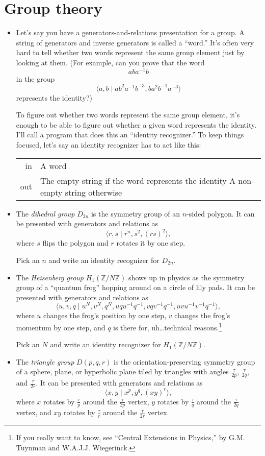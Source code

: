 \documentclass{article}
\newcommand*{\note}{\item[\Letter]}
\newcommand*{\writeit}{\item[\NibRight]}
\newcommand{\spec}[1]{{\sc #1}}
\begin{document}
\section*{Group theory}
\begin{itemize}
\note
Let's say you have a generators-and-relations presentation for a group. A string of generators and inverse generators is called a ``word.'' It's often very hard to tell whether two words represent the same group element just by looking at them. (For example, can you prove that the word
\[ aba^{-1}b \]
in the group
\[ \langle a, b \mid ab^2a^{-1}b^{-3}, ba^2b^{-1}a^{-3} \rangle \]
represents the identity?)

To figure out whether two words represent the same group element, it's enough to be able to figure out whether a given word represents the identity. I'll call a program that does this an ``identity recognizer.'' To keep things focused, let's say an identity recognizer has to act like this:

\begin{tabularx}{\textwidth}{rX}
\spec{in} & A word \\
\spec{out} & The empty string if the word represents the identity \newline A non-empty string otherwise
\end{tabularx}
\writeit
The {\em dihedral group} $D_{2n}$ is the symmetry group of an $n$-sided polygon. It can be presented with generators and relations as
\[ \langle r, s \mid r^n, s^2, (rs)^2 \rangle, \]
where $s$ flips the polygon and $r$ rotates it by one step.

Pick an $n$ and write an identity recognizer for $D_{2n}$.
\writeit
The {\em Heisenberg group} $H_1(\mathbb{Z}/N\mathbb{Z})$ shows up in physics as the symmetry group of a ``quantum frog'' hopping around on a circle of lily pads. It can be presented with generators and relations as
\[ \langle u, v, q \mid u^N, v^N, q^N, uqu^{-1}q^{-1}, vqv^{-1}q^{-1}, uvu^{-1}v^{-1}q^{-1} \rangle, \]
where $u$ changes the frog's position by one step, $v$ changes the frog's momentum by one step, and $q$ is there for, uh\ldots technical reasons.\footnote{If you really want to know, see ``Central Extensions in Physics,'' by G.M. Tuynman and W.A.J.J. Wiegerinck.}

Pick an $N$ and write an identity recognizer for $H_1(\mathbb{Z}/N\mathbb{Z})$.
\writeit
The {\em triangle group} $D(p, q, r)$ is the orientation-preserving symmetry group of a sphere, plane, or hyperbolic plane tiled by triangles with angles $\frac{\tau}{2p}$, $\frac{\tau}{2q}$, and $\frac{\tau}{2r}$. It can be presented with generators and relations as
\[ \langle x, y \mid x^p, y^q, (xy)^r \rangle, \]
where $x$ rotates by $\frac{\tau}{p}$ around the $\frac{\tau}{2p}$ vertex, $y$ rotates by $\frac{\tau}{q}$ around the $\frac{\tau}{2q}$ vertex, and $xy$ rotates by $\frac{\tau}{r}$ around the $\frac{\tau}{2r}$ vertex.


\end{itemize}
\end{document}
